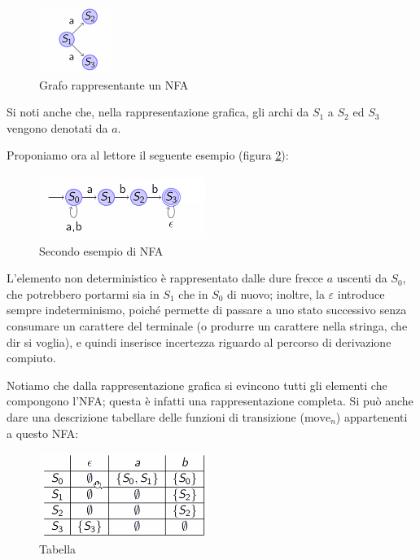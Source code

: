 \documentclass[class=book, crop=false, oneside, 12pt]{standalone}
\begin{document}
\begin{figure}
    \centering
    \includegraphics[width=.2\textwidth,keepaspectratio]{nfa_grafo_esempio}
    \caption{Grafo rappresentante un NFA}
    \label{nfa_grafo_esempio}
\end{figure}

\noindent Si noti anche che, nella rappresentazione grafica, gli archi da \(S_1\) a \(S_2\) ed \(S_3\) vengono denotati da \(a\).

Proponiamo ora al lettore il seguente esempio (figura \ref{nfa_grafo_2}):
\begin{figure}
    \centering
    \includegraphics[width=.5\textwidth,keepaspectratio]{nfa_grafo_2}
    \caption{Secondo esempio di NFA}
    \label{nfa_grafo_2}
\end{figure}
L’elemento non deterministico è rappresentato dalle dure frecce \(a\) uscenti da \(S_0\), che potrebbero portarmi sia in \(S_1\) che in \(S_0\) di nuovo; inoltre, la \(\varepsilon\) introduce sempre indeterminismo, poiché permette di passare a uno stato successivo senza consumare un carattere del terminale (o produrre un carattere nella stringa, che dir si voglia), e quindi inserisce incertezza riguardo al percorso di derivazione compiuto.

Notiamo che dalla rappresentazione grafica si evincono tutti gli elementi che compongono l’NFA; questa è infatti una rappresentazione completa.
Si può anche dare una descrizione tabellare delle funzioni di transizione (\(\textrm{move}_n\)) appartenenti a questo NFA:

\begin{figure}
    \centering
    \includegraphics[width=.4\textwidth,keepaspectratio]{tabella}
    \caption{Tabella}
    \label{tabella}
\end{figure}
\end{document}

